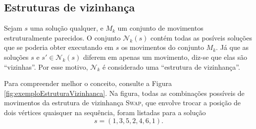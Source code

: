 \subsection{Estruturas de vizinhança}
Sejam \(s\) uma solução qualquer, e \(M_k\) um conjunto de movimentos estruturalmente parecidos. O conjunto \(\mathcal{N}_k (s)\) contém todas as posíveis soluções que se poderia obter executando em \(s\) os movimentos do conjunto \(M_k\). Já que as soluções \(s\) e \(s' \in \mathcal{N}_k(s)\) diferem em apenas um movimento, diz-se que elas são ``vizinhas''. Por esse motivo, \(\mathcal{N}_k\) é considerado uma ``estrutura de vizinhança''. 

Para compreender melhor o conceito, consulte a Figura \ref{fig:exemploEstruturaVizinhanca}. Na figura, todas as combinações possíveis de movimentos da estrutura de vizinhança \textsc{Swap}, que envolve trocar a posição de dois vértices quaisquer na sequência, foram listadas para a solução \[s = (1, 3, 5, 2, 4, 6, 1).\]

